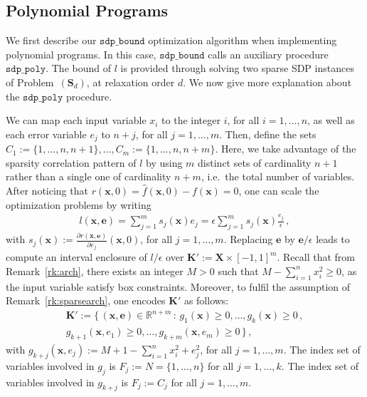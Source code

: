 \documentclass[preprint]{sigplanconf}
\newcommand{\R}{\mathbb{R}}
\newcommand{\x}{\mathbf{x}}
\newcommand{\e}{\mathbf{e}}
\def\S{\mathbf{S}}
\def\K{\mathbf{K}}
\def\S{\mathbf{S}}
\def\X{\mathbf{X}}
\newcommand{\sdpbound}{\mathtt{sdp\_bound}}
\newcommand{\sdppoly}{\mathtt{sdp\_poly}}
\theoremstyle{plain}
\begin{document}
\subsection{Polynomial Programs}
\label{sec:polsdp}
%
We first describe our $\sdpbound$ optimization algorithm when implementing polynomial programs. In this case, $\sdpbound$ calls an auxiliary procedure $\sdppoly$.
The bound of $l$ is provided through solving two sparse SDP instances of Problem~$(\S_d)$, at relaxation order $d$. We now give more explanation about the $\sdppoly$ procedure.

We can map each input variable $x_i$ to the integer $i$, for all $i=1,\dots,n$, as well as each error variable $e_j$ to $n+j$, for all $j=1,\dots,m$. Then, define the sets $C_1 := \{1,\dots,n,n+1\}, \dots, C_m := \{1,\dots,n,n+m\}$. Here, we take advantage of the sparsity correlation pattern of $l$ by using $m$ distinct sets of cardinality $n+1$ rather than a single one of cardinality $n+m$, i.e.~the total number of variables. 
After noticing that $r(\x,0) = \hat{f}(\x,0) - f(\x) = 0$, one can scale the optimization problems by writing 
\begin{align}
\label{eq:lscale}
l(\x,\e) = \sum_{j=1}^m s_j (\x) e_j = \epsilon \sum_{j=1}^m s_j (\x) \frac{e_j}{\epsilon} \,,
\end{align}
%
with $s_j(\x) := \frac{\partial r(\x,\e)} {\partial e_j} (\x,0)$, for all $j=1,\dots,m$. Replacing $\e$ by $\e/\epsilon$ leads to compute an interval enclosure of $l/\epsilon$ over $\K' := \X \times [-1, 1]^m$.
Recall that from Remark~\ref{rk:arch}, there exists an integer $M > 0$ such that $M - \sum_{i=1}^n x_i^2 \geq 0$, as the input variable satisfy box constraints.
Moreover, to fulfil the assumption of Remark~\ref{rk:sparsearch},  one encodes $\K'$ as follows: 
\begin{align*}
\K' := \{\, (\x,\e) \in \R^{n+m} \, : \, g_1 (\x) \geq 0, \dots, g_k(\x) \geq 0 \,, \\
g_{k+1}(\x,e_1) \geq 0, \dots, g_{k+m} (\x, e_m) \geq 0 \,\} \,,
\end{align*}
%
with $g_{k+j}(\x, e_j) := M + 1 -  \sum_{i=1}^n x_i^2 + e_j^2$, for all $j=1,\dots, m$. 
The index set of variables involved in $g_j$ is $F_j := N = \{1, \dots, n\}$ for all $j=1, \dots, k$. 
The index set of variables involved in $g_{k+j}$ is $F_j := C_j$ for all $j=1, \dots, m$. 
\end{document}
